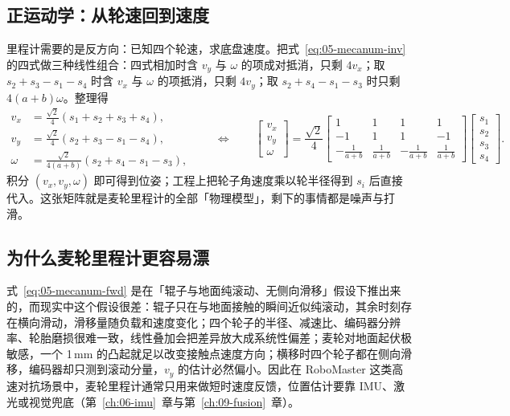 \subsection{正运动学：从轮速回到速度}

里程计需要的是反方向：已知四个轮速，求底盘速度。把式~\eqref{eq:05-mecanum-inv} 的四式做三种线性组合：四式相加时含 $v_y$ 与 $\omega$ 的项成对抵消，只剩 $4v_x$；取 $s_2+s_3-s_1-s_4$ 时含 $v_x$ 与 $\omega$ 的项抵消，只剩 $4v_y$；取 $s_2+s_4-s_1-s_3$ 时只剩 $4(a+b)\omega$。整理得
\begin{equation}
  \begin{aligned}
    v_x &= \frac{\sqrt{2}}{4}\left(s_1+s_2+s_3+s_4\right),\\
    v_y &= \frac{\sqrt{2}}{4}\left(s_2+s_3-s_1-s_4\right),\\
    \omega &= \frac{\sqrt{2}}{4(a+b)}\left(s_2+s_4-s_1-s_3\right),
  \end{aligned}
  \qquad\Longleftrightarrow\qquad
  \begin{bmatrix}v_x\\v_y\\\omega\end{bmatrix}
  = \frac{\sqrt{2}}{4}\begin{bmatrix}
    1 & 1 & 1 & 1\\
    -1 & 1 & 1 & -1\\
    -\frac{1}{a+b} & \frac{1}{a+b} & -\frac{1}{a+b} & \frac{1}{a+b}
  \end{bmatrix}
  \begin{bmatrix}s_1\\s_2\\s_3\\s_4\end{bmatrix}.
  \label{eq:05-mecanum-fwd}
\end{equation}
积分 $(v_x,v_y,\omega)$ 即可得到位姿；工程上把轮子角速度乘以轮半径得到 $s_i$ 后直接代入。这张矩阵就是麦轮里程计的全部「物理模型」，剩下的事情都是噪声与打滑。

\subsection{为什么麦轮里程计更容易漂}

式~\eqref{eq:05-mecanum-fwd} 是在「辊子与地面纯滚动、无侧向滑移」假设下推出来的，而现实中这个假设很差：辊子只在与地面接触的瞬间近似纯滚动，其余时刻存在横向滑动，滑移量随负载和速度变化；四个轮子的半径、减速比、编码器分辨率、轮胎磨损很难一致，线性叠加会把差异放大成系统性偏差；麦轮对地面起伏极敏感，一个 1\,mm 的凸起就足以改变接触点速度方向；横移时四个轮子都在侧向滑移，编码器却只测到滚动分量，$v_y$ 的估计必然偏小。因此在 RoboMaster 这类高速对抗场景中，麦轮里程计通常只用来做短时速度反馈，位置估计要靠 IMU、激光或视觉兜底（第~\ref{ch:06-imu}~章与第~\ref{ch:09-fusion}~章）。

